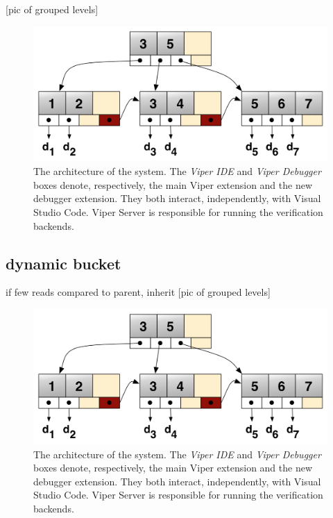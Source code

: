 [pic of grouped levels]
\begin{figure}[htb]
  \centering
  \includegraphics[width=\textwidth,height=\textheight,keepaspectratio]{img/b+tree.png}
  \caption[The architecture of the system]{ The architecture of the system. The
    \textit{Viper IDE} and \textit{Viper Debugger} boxes denote, respectively,
    the main Viper extension and the new debugger extension. They both interact,
    independently, with Visual Studio Code. Viper Server is responsible for
    running the verification backends.}
  \label{fig:b+tree}
\end{figure}

\subsection{dynamic bucket}\label{sec:variable-size buckets}
if few reads compared to parent, inherit
[pic of grouped levels]
\begin{figure}[htb]
  \centering
  \includegraphics[width=\textwidth,height=\textheight,keepaspectratio]{img/b+tree.png}
  \caption[The architecture of the system]{ The architecture of the system. The
    \textit{Viper IDE} and \textit{Viper Debugger} boxes denote, respectively,
    the main Viper extension and the new debugger extension. They both interact,
    independently, with Visual Studio Code. Viper Server is responsible for
    running the verification backends.}
  \label{fig:b+tree}
\end{figure}

